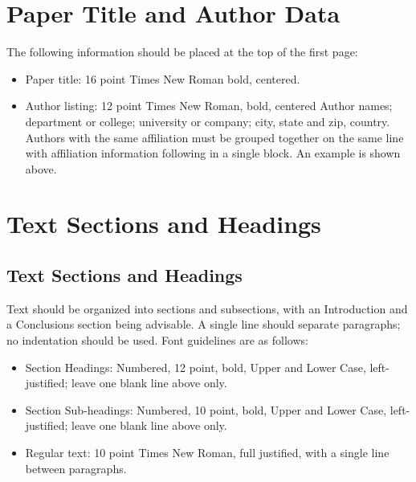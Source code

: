 \documentclass{iserc}%
\begin{document}
\section{Paper Title and Author Data}
The following information should be placed at the top of the first page:
\begin{itemize}
\item Paper title: 16 point Times New Roman bold, centered.
\item Author listing: 12 point Times New Roman, bold, centered Author names; department or college; university or company; city, state and zip, country.  Authors with the same affiliation must be grouped together on the same line with affiliation information following in a single block.  An example is shown above.
\end{itemize}

\section{Text Sections and Headings}
\vspace{12pt}%
\subsection{Text Sections and Headings}
Text should be organized into sections and subsections, with an Introduction and a Conclusions section being advisable.  A single line should separate paragraphs; no indentation should be used.  Font guidelines are as follows:
\begin{itemize}
\item Section Headings: Numbered, 12 point, bold, Upper and Lower Case, left-justified; leave one blank line above only.
\item Section Sub-headings: Numbered, 10 point, bold, Upper and Lower Case, left-justified; leave one blank line above only.
\item Regular text: 10 point Times New Roman, full justified, with a single line between paragraphs.
\end{itemize}
\end{document}
